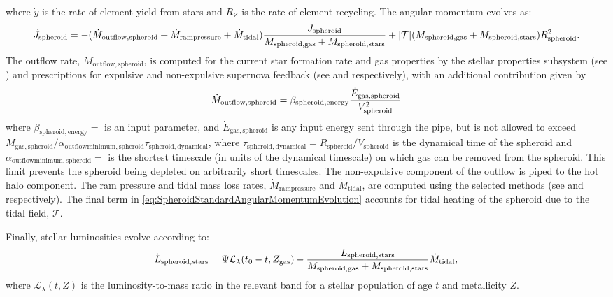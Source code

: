 where $\dot{y}$ is the rate of element yield from stars and $\dot{R}_Z$ is the rate of element recycling. The angular momentum evolves as:
\begin{equation}
 \dot{J}_\mathrm{spheroid} = - (\dot{M}_\mathrm{outflow, spheroid} + \dot{M}_\mathrm{ram pressure}+\dot{M}_\mathrm{tidal}) {J_\mathrm{spheroid} \over M_\mathrm{spheroid, gas} + M_\mathrm{spheroid, stars}} + |\mathcal{T}| ( M_\mathrm{spheroid, gas} + M_\mathrm{spheroid, stars} ) R_\mathrm{spheroid}^2.
 \label{eq:SpheroidStandardAngularMomentumEvolution}
\end{equation}
The outflow rate, $\dot{M}_\mathrm{outflow, spheroid}$, is computed for the current star formation rate and gas properties by the stellar properties subsystem (see ) and prescriptions for expulsive and non-expulsive supernova feedback (see  and  respectively), with an additional contribution given by
\begin{equation}
 \dot{M}_\mathrm{outflow, spheroid} = \beta_\mathrm{spheroid, energy} {\dot{E}_\mathrm{gas, spheroid} \over V_\mathrm{spheroid}^2}
\end{equation}
where $\beta_\mathrm{spheroid, energy}=$\mono{[spheroidEnergeticOutflowMassRate]} is an input parameter, and $\dot{E}_\mathrm{gas,spheroid}$ is any input energy sent through the  pipe, but is not allowed to exceed $M_\mathrm{gas, spheroid}/ \alpha_\mathrm{outflow minimum, spheroid} \tau_\mathrm{spheroid, dynamical}$, where $\tau_\mathrm{spheroid, dynamical}=R_\mathrm{spheroid}/V_\mathrm{spheroid}$ is the dynamical time of the spheroid and $\alpha_\mathrm{outflow minimum, spheroid}=$\mono{[spheroidOutflowTimescaleMinimum]} is the shortest timescale (in units of the dynamical timescale) on which gas can be removed from the spheroid. This limit prevents the spheroid being depleted on arbitrarily short timescales. The non-expulsive \gls{component} of the outflow is piped to the hot halo component. The ram pressure and tidal mass loss rates, $\dot{M}_\mathrm{ram pressure}$ and $\dot{M}_\mathrm{tidal}$, are computed using the selected methods (see  and  respectively). The final term in \ref{eq:SpheroidStandardAngularMomentumEvolution} accounts for tidal heating of the spheroid due to the tidal field, $\mathcal{T}$.

Finally, stellar luminosities evolve according to:
\begin{equation}
\dot{L}_\mathrm{spheroid, stars} = \Psi \mathcal{L}_\lambda(t_0-t,Z_\mathrm{gas}) - {L_\mathrm{spheroid, stars} \over M_\mathrm{spheroid, gas} + M_\mathrm{spheroid, stars}} \dot{M}_\mathrm{tidal},
\end{equation}
where $\mathcal{L}_\lambda(t,Z)$ is the luminosity-to-mass ratio in the relevant band for a stellar population of age $t$ and metallicity $Z$.

